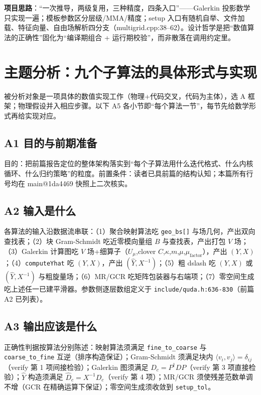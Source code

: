 \documentclass[UTF8]{ctexart}
\begin{document}
\textbf{项目思路}：``一次推导，两级复用，三种精度，四条入口''——Galerkin 投影数学只实现一遍；模板参数区分层级/MMA/精度；setup 入口有随机自举、文件加载、特征向量、自由场解析四分支（multigrid.cpp:38--62）。\textcolor{idea}{设计哲学是把``数值算法的正确性''固化为``编译期组合 + 运行期校验''，而非散落在调用约定里。}

\section{主题分析：九个子算法的具体形式与实现}

被分析对象是一项具体的数值实现工作（物理+代码交叉，代码为主体），选 A 框架；物理假设并入相应步骤。以下 A5 各小节即``每个算法一节''，每节先给数学形式再给实现对应。

\subsection{A1 目的与前期准备}

目的：把前篇报告定位的整体架构落实到``每个子算法用什么迭代格式、什么内核循环、什么归约策略''的粒度。前置条件：读者已具前篇的结构认知；本篇所有行号均在 main@1da4469 快照上二次核实。

\subsection{A2 输入是什么}

各算法的输入沿数据流串联：（1）聚合映射算法吃 \texttt{geo\_bs[]} 与场几何，产出双向查找表；（2）块 Gram-Schmidt 吃近零模向量组 $B$ 与查找表，产出打包 $V$ 场；（3）Galerkin 计算图吃 $V$ 场+细算子（$U_\mu$,clover $C$,$\kappa$,$m$,$\mu$,$\mu_{\text{factor}}$），产出 $(Y,X)$；（4）\texttt{computeYhat} 吃 $(Y,X)$，产出 $(\hat Y,X^{-1})$；（5）粗 dslash 吃 $(Y,X)$ 或 $(\hat Y,X^{-1})$ 与粗旋量场；（6）MR/GCR 吃矩阵包装器与右端项；（7）零空间生成吃上述任一已建平滑器。参数侧逐层数组定义于 \texttt{\nolinkurl{include/quda.h:636-830}}（前篇 A2 已列表）。

\subsection{A3 输出应该是什么}

正确性判据按算法分别陈述：映射算法须满足 \texttt{fine\_to\_coarse} 与 \texttt{coarse\_to\_fine} 互逆（排序构造保证）；Gram-Schmidt 须满足块内 $\langle v_i,v_j\rangle=\delta_{ij}$（verify 第 1 项间接检验）；Galerkin 图须满足 $D_c=P^\dagger DP$（verify 第 3 项直接检验）；$\hat Y$ 构造须满足 $\hat D_c=X^{-1}D_c$（verify 第 4 项）；MR/GCR 须使残差范数单调不增（GCR 在精确运算下保证）；零空间生成须收敛到 \texttt{setup\_tol}。
\end{document}
